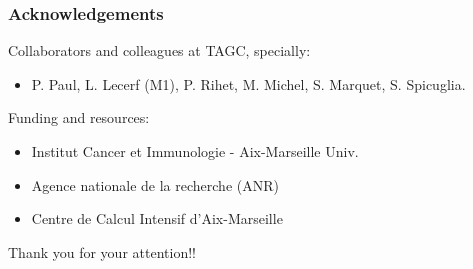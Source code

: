 \documentclass{beamer}
\newcounter{frame}[frame]
\begin{document}
    \begin{frame}
        \frametitle{Acknowledgements}

%
        Collaborators and colleagues at TAGC, specially:
        \begin{itemize}
            \item P. Paul, L. Lecerf (M1), P. Rihet, M. Michel, S. Marquet, S. Spicuglia.
        \end{itemize}
%
        \vfill
%
        Funding and resources:
%
        \begin{itemize}
            \item Institut Cancer et Immunologie - Aix-Marseille Univ.
            \item Agence nationale de la recherche (ANR)
            \item Centre de Calcul Intensif d'Aix-Marseille
        \end{itemize}
%
        \vfill
        Thank you for your attention!!

    \end{frame}
\end{document}
